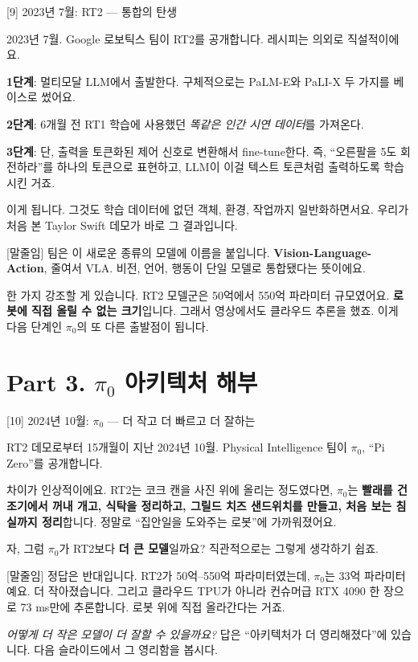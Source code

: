 \documentclass[aspectratio=169,10pt]{beamer}
\newenvironment{script}{%
  \footnotesize
  \setlength{\parskip}{0.5em}
  \setlength{\parindent}{0pt}
}{}
\begin{document}
\begin{frame}{[9] 2023년 7월: RT2 --- 통합의 탄생}
\begin{script}
2023년 7월. Google 로보틱스 팀이 RT2를 공개합니다. 레시피는 의외로 직설적이에요.

\textbf{1단계}: 멀티모달 LLM에서 출발한다. 구체적으로는 PaLM-E와 PaLI-X 두 가지를 베이스로 썼어요.

\textbf{2단계}: 6개월 전 RT1 학습에 사용했던 \emph{똑같은 인간 시연 데이터}를 가져온다.

\textbf{3단계}: 단, 출력을 토큰화된 제어 신호로 변환해서 fine-tune한다. 즉, ``오른팔을 5도 회전하라''를 하나의 토큰으로 표현하고, LLM이 이걸 텍스트 토큰처럼 출력하도록 학습시킨 거죠.

이게 됩니다. 그것도 \alert{학습 데이터에 없던 객체, 환경, 작업까지 일반화}하면서요. 우리가 처음 본 Taylor Swift 데모가 바로 그 결과입니다.

[말줄임] 팀은 이 새로운 종류의 모델에 이름을 붙입니다. \textbf{Vision-Language-Action}, 줄여서 VLA. 비전, 언어, 행동이 단일 모델로 통합됐다는 뜻이에요.

한 가지 강조할 게 있습니다. RT2 모델군은 50억에서 550억 파라미터 규모였어요. \textbf{로봇에 직접 올릴 수 없는 크기}입니다. 그래서 영상에서도 클라우드 추론을 했죠. 이게 다음 단계인 $\pi_0$의 또 다른 출발점이 됩니다.
\end{script}
\end{frame}

\section{Part 3. $\pi_0$ 아키텍처 해부}

\begin{frame}{[10] 2024년 10월: $\pi_0$ --- 더 작고 더 빠르고 더 잘하는}
\begin{script}
RT2 데모로부터 15개월이 지난 2024년 10월. Physical Intelligence 팀이 $\pi_0$, ``Pi Zero''를 공개합니다.

차이가 인상적이에요. RT2는 코크 캔을 사진 위에 올리는 정도였다면, $\pi_0$는 \textbf{빨래를 건조기에서 꺼내 개고, 식탁을 정리하고, 그릴드 치즈 샌드위치를 만들고, 처음 보는 침실까지 정리}합니다. 정말로 ``집안일을 도와주는 로봇''에 가까워졌어요.

자, 그럼 $\pi_0$가 RT2보다 \textbf{더 큰 모델}일까요? 직관적으로는 그렇게 생각하기 쉽죠.

[말줄임] 정답은 반대입니다. RT2가 50억--550억 파라미터였는데, $\pi_0$는 \alert{33억 파라미터}예요. 더 작아졌습니다. 그리고 클라우드 TPU가 아니라 \alert{컨슈머급 RTX 4090} 한 장으로 \alert{73 ms}만에 추론합니다. 로봇 위에 직접 올라간다는 거죠.

\textit{어떻게 더 작은 모델이 더 잘할 수 있을까요?} 답은 ``아키텍처가 더 영리해졌다''에 있습니다. 다음 슬라이드에서 그 영리함을 봅시다.
\end{script}
\end{frame}
\end{document}
